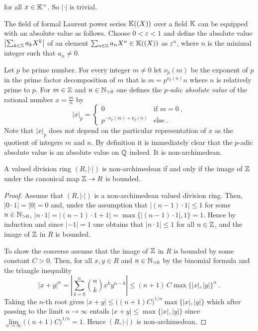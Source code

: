 \begin{examples}
\begin{environmentlist}
  for all $x\in \mathbb{K}^\times$. So $|\cdot|$ is trivial.
\item 
  The field of formal Laurent power series $\mathbb{K} ((X))$ over a field $\mathbb{K}$ can be equipped
  with an absolute value as follows. Choose $0<\varepsilon < 1$
  and define the absolute value $\left| \sum_{k\in \mathbb{Z}} a_k X^k\right| $ of an element
  $\sum_{n\in \mathbb{Z}} a_n X^n\in \mathbb{K} ((X)) $ as $\varepsilon^n$, where $n$ is the minimal integer such that $a_n\neq 0$.  
\item
  Let $p$ be prime number. For every integer $m\neq 0$ let $\nu_p(m)$ be the exponent of $p$ in the prime factor decomposition of $m$
  that is $m = p^{\nu_p(n)}n$ where $n$ is relatively prime to $p$.
  For $m \in \mathbb{Z}$ and $n\in \mathbb{N}_{> 0}$ one defines the \emph{$p$-adic absolute value} of the rational number $x = \frac mn$ by
  \[
    \left| x \right|_p =
    \begin{cases}
      0 & \text{if } m=0 \ ,\\
      p^{-\nu_p(m) +\nu_p(n)} & \text{else}\ . 
    \end{cases}
  \]
  Note that $ \left| x \right|_p$ does not depend on the particular representation of $x$ as the quotient of integers $m$ and $n$.
  By definition it is immediately clear that the $p$-adic absolute value is an absolute value on $\mathbb{Q}$ indeed. 
  It is non-archimedean.
\end{environmentlist}
\end{examples}

\begin{proposition}
  A valued division ring $(R,|\cdot|)$ is non-archimedean if and only if the image of $\mathbb{Z}$ under
  the canonical map  $\mathbb{Z}\to R$ is bounded. 
\end{proposition}

\begin{proof}
  Assume that $(R,|\cdot|)$ is a non-archimedean valued division ring.
  Then, $|0 \cdot 1| = |0|= 0 $ and, under the assumption that $|(n-1)\cdot 1|\leq 1$ for some $n\in \mathbb{N}_{> 0}$,
  $|n\cdot 1| = | (n-1)\cdot 1 + 1 | = \max \{ |(n-1)\cdot 1| , 1 \} = 1$.
  Hence by induction and since $|-1| =1$ one obtains that $|n\cdot 1|\leq 1$ for all $n\in \mathbb{Z}$,
  and the image of $\mathbb{Z}$ in $R$ is bounded.

  To show the converse assume that the image of $\mathbb{Z}$ in $R$ is bounded by some constant $C>0$. Then, for all $x,y\in R$
  and $n\in \mathbb{N}_{> 0}$ by the binomial formula and the triangle inequality
  \[
    |x+y|^n =\left|\sum_{k=0}^n {n \choose k} x^k y^{n-k} \right|
    \leq (n+1) \,C \max \{|x|,|y|\}^n \ .
  \]
  Taking the $n$-th root gives $|x+y|\leq \big( (n+1)C\big)^{1/n} \max \{|x|,|y|\}$ which after passing to the limit $n\to\infty$
  entails  $|x+y| \leq \max \{|x|,|y|\}$ since $\lim\limits_{n\to\infty} \big( (n+1)C\big)^{1/n} = 1$. Hence
  $(R,|\cdot|)$ is non-archimedean. 
\end{proof}

